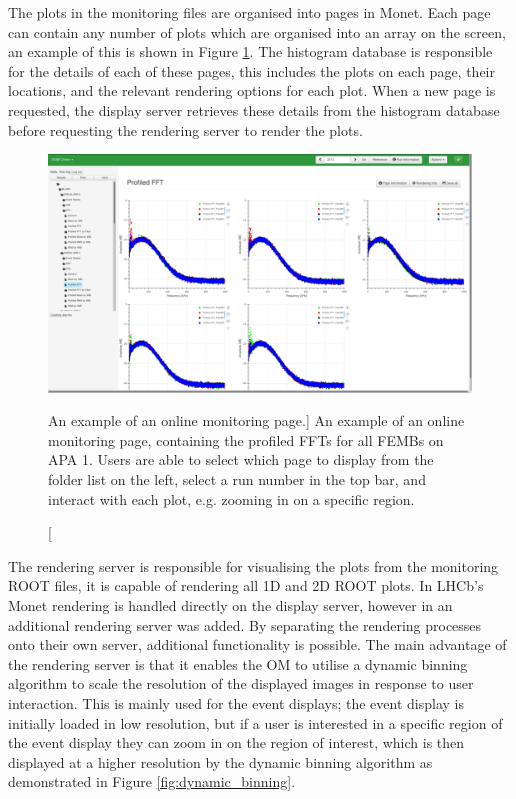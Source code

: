 The plots in the monitoring files are organised into pages in Monet. Each page
can contain any number of plots which are organised into an array on the screen,
an example of this is shown in Figure \ref{fig:monet_page}. The histogram 
database is responsible for the details of each of these pages, this includes
the plots on each page, their locations, and the relevant rendering options for
each plot. When a new page is requested, the display server retrieves these
details from the histogram database before requesting the rendering server to 
render the plots.

\begin{figure}

	\centering

	\includegraphics[width=\textwidth]{figures/profiled_fft_monet.png}

	\caption
	[An example of an online monitoring page.] 
	{ An example of an online monitoring page, containing the profiled FFTs for
	all FEMBs on APA 1. Users are able to select which page to display from the
	folder list on the left, select a run number in the top bar, and interact 
	with each plot, e.g. zooming in on a specific region.} 
	\label{fig:monet_page}

\end{figure}

The rendering server is responsible for visualising the plots from the 
monitoring ROOT files, it is capable of rendering all 1D and 2D ROOT plots. In 
LHCb's Monet rendering is handled directly on the display server, however in 
\protodune{} an additional rendering server was added. By separating the 
rendering processes onto their own server, additional functionality is 
possible. The main advantage of the rendering server is that it enables the 
OM to utilise a dynamic binning algorithm to scale the resolution of the 
displayed images in response to user interaction. This is mainly used for the 
event displays; the event display is initially loaded in low resolution, but 
if a user is interested in a specific region of the event display they can 
zoom in on the region of interest, which is then displayed at a higher 
resolution by the dynamic binning algorithm as demonstrated in Figure 
\ref{fig:dynamic_binning}.

